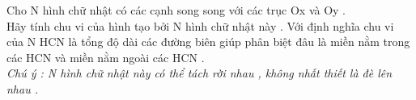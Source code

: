 Cho N hình chữ nhật có các cạnh song song với các trục Ox và Oy .   
\\   Hãy tính chu vi của hình tạo bởi N hình chữ nhật này . Với định nghĩa chu vi của N HCN là tổng độ dài các đường biên giúp phân biệt đâu là miền nằm trong các HCN và miền nằm ngoài các HCN .   
\\\textit{    Chú ý : N hình chữ nhật này có thể tách rời nhau , không nhất thiết là đè lên nhau .   }

\